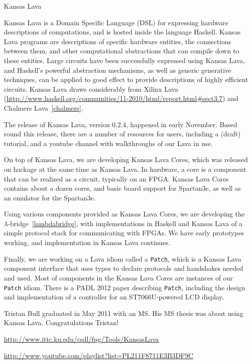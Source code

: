 \begin{hcarentry}{Kansas Lava}
\label{klava}
\makeheader

Kansas Lava is a Domain Specific Language (DSL) for expressing
hardware descriptions of computations, and is hosted inside the
language Haskell. Kansas Lava programs are descriptions of specific hardware
entities, the connections between them, and other computational abstractions
that can compile down to these entities. Large circuits have been successfully
expressed using Kansas Lava, and Haskell's powerful abstraction mechanisms, as
well as generic generative techniques, can be applied to good effect to provide
descriptions of highly efficient circuits.
Kansas Lava draws considerably from Xilinx Lava~%
(\url{http://www.haskell.org/communities/11-2010/html/report.html#sect3.7})
and
Chalmers Lava~\cref{chalmers}.

The release of Kansas Lava, version 0.2.4, happened in early November.
Based round this release, there are a number of resources for users,
including a (draft) tutorial, and a youtube channel with
walkthroughs of our Lava in use.

On top of Kansas Lava, we are developing Kansas Lava Cores, which was released
on hackage at the same time as Kansas Lava. In hardware, a core is a component
that can be realized as a circuit, typically on an FPGA. Kansas Lava Cores
contains about a dozen cores, and basic board support for Spartan3e,
as well as an emulator for the Spartan3e.

Using various components provided as Kansas Lava Cores, we are developing the
$\lambda$-bridge~\cref{lambdabridge}, with implementations in Haskell and
Kansas Lava of a simple protocol stack for communicating with FPGAs. We have
early prototypes working, and implementation in Kansas Lava continues.

Finally, we are working on a Lava idiom called a {\tt Patch}, which is a Kansas
Lava component interface that uses types to declare protocols and handshakes
needed and used. Most of components in the Kansas Lava Cores are instances of
our {\tt Patch} idiom. There is a PADL 2012 paper describing {\tt Patch},
including the design and implementation of a controller for an ST7066U-powered
LCD display.

Tristan Bull graduated in May 2011 with an MS. His MS thesis was about using
Kansas Lava. Congratulations Tristan!

\FurtherReading
\begin{compactitem}
\item
  \url{http://www.ittc.ku.edu/csdl/fpg/Tools/KansasLava}\\
\item
  \url{http://www.youtube.com/playlist?list=PL211F8711E3B3DF9C}  
\end{compactitem}
\end{hcarentry}
